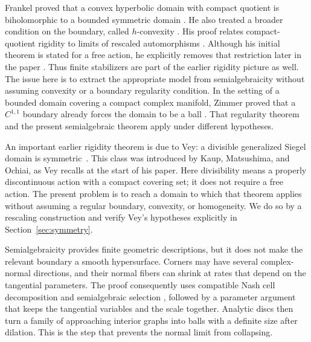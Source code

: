 \documentclass[11pt]{article}
\numberwithin{equation}{section}
\theoremstyle{definition}
\theoremstyle{remark}
\begin{document}
Frankel proved that a convex hyperbolic domain with compact quotient is
biholomorphic to a bounded symmetric domain
\cite[Theorem~1]{Frankel1989}. He also treated a broader condition on
the boundary, called $h$-convexity
\cite[Theorem~2.6 and Definition~7.3]{Frankel1989}. His proof relates
compact-quotient rigidity to limits of rescaled automorphisms
\cite[Section~3]{Frankel1989}. Although his initial theorem is stated for
a free action, he explicitly removes that restriction later in the paper
\cite[p.~144, following Lemma~11.8]{Frankel1989}. Thus finite stabilizers
are part of the earlier rigidity picture as well. The issue here is to
extract the appropriate model from semialgebraicity without assuming
convexity or a boundary regularity condition. In the setting of a bounded
domain covering a compact complex manifold, Zimmer proved that a
$C^{1,1}$ boundary already forces the domain to be a ball
\cite[Theorem~1.1]{Zimmer2021}. That regularity theorem and the present
semialgebraic theorem apply under different hypotheses.

An important earlier rigidity theorem is due to Vey: a divisible
generalized Siegel domain is symmetric~\cite[Theorem~1 and the following
paragraph]{Vey1970}. This class was introduced by Kaup, Matsushima, and
Ochiai, as Vey recalls at the start of his paper. Here divisibility means a properly discontinuous
action with a compact covering set; it does not require a free action.
The present problem is to reach a domain to which that theorem applies
without assuming a regular boundary, convexity, or homogeneity. We do so
by a rescaling construction and verify Vey's hypotheses explicitly in
Section~\ref{sec:symmetry}.

Semialgebraicity provides finite geometric descriptions, but it does not
make the relevant boundary a smooth hypersurface. Corners may have several
complex-normal directions, and their normal fibers can shrink at rates
that depend on the tangential parameters. The proof consequently uses
compatible Nash cell decomposition and semialgebraic selection
\cite[Sections~1.1--1.2]{Coste2005}, followed by a parameter argument that
keeps the tangential variables and the scale together. Analytic discs then
turn a family of approaching interior graphs into balls with a definite
size after dilation. This is the step that prevents the normal limit from
collapsing.
\end{document}
